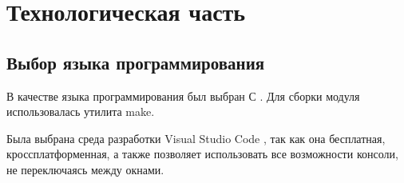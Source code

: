 \section{Технологическая часть}

\subsection{Выбор языка программирования}
В качестве языка программирования был выбран С \cite{c}. Для сборки модуля использовалась утилита make.

Была выбрана среда разработки Visual Studio Code \cite{VStudio}, так как она бесплатная, кроссплатформенная,  а также позволяет использовать все возможности консоли, не переключаясь между окнами. \newline

